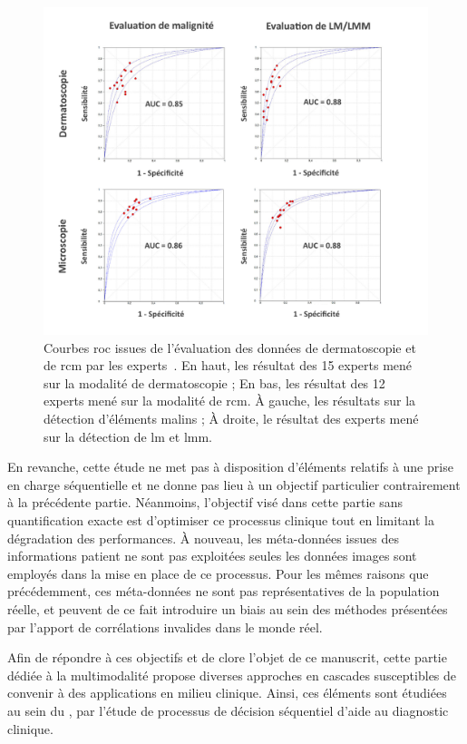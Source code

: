 \begin{figure}[H]
    \begin{center}
        \includegraphics[width=\linewidth]{contents/iii_preamble_multimodal/resources/results_roc_experts.pdf}
        \caption{Courbes \gls{roc} issues de l'évaluation des données de dermatoscopie et de \gls{rcm} par les experts~\cite{Cinotti2018}. En haut, les résultat des 15 experts mené sur la modalité de dermatoscopie ; En bas, les résultat des 12 experts mené sur la modalité de \gls{rcm}. À gauche, les résultats sur la détection d'éléments malins ; À droite, le résultat des experts mené sur la détection de \gls{lm} et \gls{lmm}.}
        \label{fig:results_roc_experts}
    \end{center} 
\end{figure}\par

En revanche, cette étude ne met pas à disposition d'éléments relatifs à une prise en charge séquentielle et ne donne pas lieu à un objectif particulier contrairement à la précédente partie. Néanmoins, l'objectif visé dans cette partie sans quantification exacte est d'optimiser ce processus clinique tout en limitant la dégradation des performances. À nouveau, les méta-données issues des informations patient ne sont pas exploitées seules les données images sont employés dans la mise en place de ce processus. Pour les mêmes raisons que précédemment, ces méta-données ne sont pas représentatives de la population réelle, et peuvent de ce fait introduire un biais au sein des méthodes présentées par l'apport de corrélations invalides dans le monde réel.\par

Afin de répondre à ces objectifs et de clore l'objet de ce manuscrit, cette partie dédiée à la multimodalité propose diverses approches en cascades susceptibles de convenir à des applications en milieu clinique. Ainsi, ces éléments sont étudiées au sein du , par l'étude de processus de décision séquentiel d'aide au diagnostic clinique.\par
